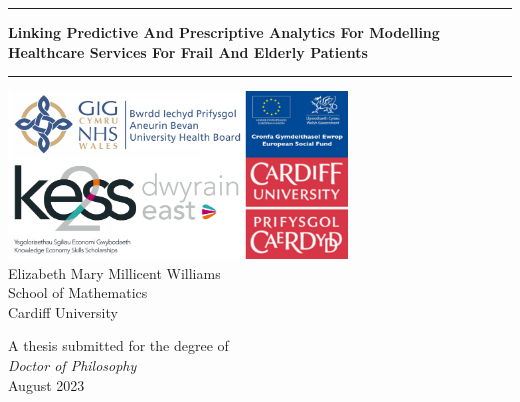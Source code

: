 \documentclass[../thesis.tex]{subfiles}
\begin{document}
\thispagestyle{empty} %
\centering
\vspace*{0.05\textheight} %

\rule{\textwidth}{0.4pt}%
\vspace{1\baselineskip} 
{\LARGE \textbf{Linking Predictive And Prescriptive Analytics For Modelling Healthcare Services For Frail And Elderly Patients}}
\vspace{0.75\baselineskip} %
\rule{\textwidth}{0.4pt}\vspace*{-\baselineskip}\vspace{3.2pt}
\vfill
\includegraphics[width =90mm]{includes/Combined images.png}\\
\vfill
{\Large Elizabeth Mary Millicent Williams}\\
\vspace{0.75\baselineskip} 
{\Large School of Mathematics}\\
\vspace{0.75\baselineskip}
{\Large Cardiff University}
\vfill

{\Large A thesis submitted for the degree of\\[0.35em] \textit{Doctor of Philosophy}}\\
\vfill
{\Large August 2023}      %

\end{document}
